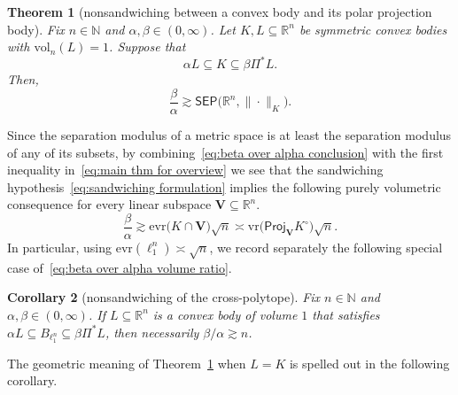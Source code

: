 \documentclass[11pt,reqno]{amsart}
\newcommand{\vr}{\mathrm{vr}}
\newcommand{\evr}{\mathrm{evr}}
\newcommand{\proj}{\mathsf{Proj}}
\newcommand{\R}{\mathbb R}
\newtheorem{theorem}{Theorem}
\newtheorem{corollary}[theorem]{Corollary}
\theoremstyle{remark}
\renewcommand{\subset}{\subseteq}
\newcommand{\N}{\mathbb N}
\newcommand{\vol}{\mathrm{vol}}
\renewcommand{\1}{\mathbf 1}
\newcommand{\sep}{\mathsf{SEP}}
\begin{document}
\begin{theorem}[nonsandwiching between a convex body and its polar projection body]\label{thm:non-sandwiching} Fix $n\in \N$ and $\alpha,\beta\in (0,\infty)$. Let $K,L\subset \R^n$ be symmetric convex bodies with $\vol_n(L)=1$. Suppose that
\begin{equation}\label{eq:sandwiching formulation}
\alpha L\subset K\subset \beta \Pi^*\!L.
\end{equation}
Then,
\begin{equation}\label{eq:beta over alpha conclusion}
\frac{\beta}{\alpha}\gtrsim \sep\big(\R^n,\|\cdot\|_K\big).
\end{equation}
\end{theorem}




Since the separation modulus of a metric space is at least the separation modulus of any of its subsets, by combining~\eqref{eq:beta over alpha conclusion} with the first inequality in~\eqref{eq:main thm for overview} we see that the sandwiching hypothesis~\eqref{eq:sandwiching formulation} implies the following purely volumetric consequence for every linear subspace $\mathbf{V}\subset \R^n$.
\begin{equation}\label{eq:beta over alpha volume ratio}
\frac{\beta}{\alpha}\gtrsim  \evr\big(K\cap\mathbf{V}\big)\sqrt{n}\asymp \vr\big(\proj_\mathbf{V} K^\circ\big)\sqrt{n}.
\end{equation}
In particular, using $\evr(\ell_1^n)\asymp \sqrt{n}$, we record separately  the following special case of~\eqref{eq:beta over alpha volume ratio}.
\begin{corollary}[nonsandwiching of the cross-polytope] Fix $n\in \N$ and $\alpha,\beta\in (0,\infty)$. If $L\subset \R^n$ is a convex body of volume $1$ that satisfies $\alpha L\subset B_{\ell_1^n}\subset \beta \Pi^{*}\!L$, then necessarily $\beta/\alpha\gtrsim n$.
\end{corollary}

The geometric meaning of Theorem~\ref{thm:non-sandwiching} when $L=K$ is spelled out  in the following corollary.
\end{document}
